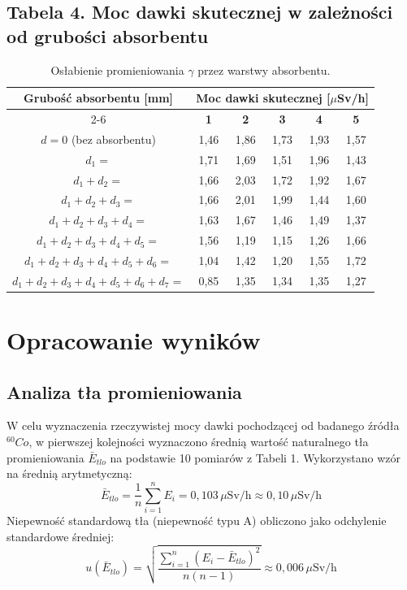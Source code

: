 \documentclass{article}
\begin{document}
\subsection*{Tabela 4. Moc dawki skutecznej w zależności od grubości absorbentu}
\begin{table}[H]
\centering
\small
\renewcommand{\arraystretch}{1.25}
\begin{tabular}{|c|c|c|c|c|c|}
\hline
\multirow{2}{*}{\textbf{Grubość absorbentu [mm]}} & \multicolumn{5}{c|}{\textbf{Moc dawki skutecznej [$\mu$Sv/h]}} \\ \cline{2-6} 
 & \textbf{1} & \textbf{2} & \textbf{3} & \textbf{4} & \textbf{5} \\ \hline
$d = 0$ (bez absorbentu) &1,46 &1,86 &1,73 &1,93 &1,57 \\ \hline
$d_1 = $ &1,71 &1,69 &1,51 &1,96 &1,43 \\ \hline
$d_1 + d_2 = $ &1,66 &2,03 &1,72 &1,92 &1,67 \\ \hline
$d_1 + d_2 + d_3 = $ &1,66 &2,01 &1,99 &1,44 &1,60 \\ \hline
$d_1 + d_2 + d_3 + d_4 = $ &1,63 &1,67 &1,46 &1,49 &1,37 \\ \hline
$d_1 + d_2 + d_3 + d_4 + d_5 = $  &1,56 &1,19 &1,15 &1,26 &1,66 \\ \hline
$d_1 + d_2 + d_3 + d_4 + d_5 + d_6 = $ &1,04 &1,42 &1,20 &1,55 &1,72 \\ \hline
$d_1 + d_2 + d_3 + d_4 + d_5 + d_6 + d_7 = $ &0,85 &1,35 &1,34 &1,35 &1,27 \\ \hline
\end{tabular}
\caption{Osłabienie promieniowania $\gamma$ przez warstwy absorbentu.}
\end{table}









\section{Opracowanie wyników}

\subsection{Analiza tła promieniowania}
W celu wyznaczenia rzeczywistej mocy dawki pochodzącej od badanego źródła $^{60}Co$, w pierwszej kolejności wyznaczono średnią wartość naturalnego tła promieniowania $\bar{E}_{tlo}$ na podstawie 10 pomiarów z Tabeli 1. Wykorzystano wzór na średnią arytmetyczną:
\begin{equation}
\bar{E}_{tlo} = \frac{1}{n} \sum_{i=1}^{n} E_i = 0,103 \, \mu\text{Sv/h} \approx 0,10 \, \mu\text{Sv/h}
\end{equation}
Niepewność standardową tła (niepewność typu A) obliczono jako odchylenie standardowe średniej:
\begin{equation}
u(\bar{E}_{tlo}) = \sqrt{\frac{\sum_{i=1}^{n} (E_i - \bar{E}_{tlo})^2}{n(n-1)}} \approx 0,006 \, \mu\text{Sv/h}
\end{equation}
\end{document}
